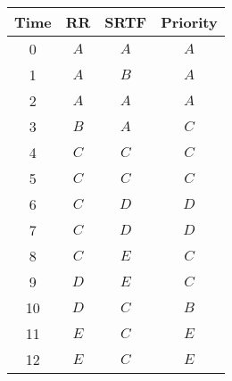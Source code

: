 \begin{latin}
\begin{center}
\begin{tabular}{|c|c|c|c|}
    \hline
    Time & RR & SRTF & Priority\\
    \hline
    0 & $A$ & $A$ & $A$ \\
    1 & $A$ & $B$ & $A$ \\
    2 & $A$ & $A$ & $A$ \\
    3 & $B$ & $A$ & $C$ \\
    4 & $C$ & $C$ & $C$ \\
    5 & $C$ & $C$ & $C$ \\
    6 & $C$ & $D$ & $D$ \\
    7 & $C$ & $D$ & $D$ \\
    8 & $C$ & $E$ & $C$ \\
    9 & $D$ & $E$ & $C$ \\
    10 & $D$ & $C$ & $B$ \\
    11 & $E$ & $C$ & $E$ \\
    12 & $E$ & $C$ & $E$ \\
    \hline
\end{tabular}
\end{center}
\end{latin}